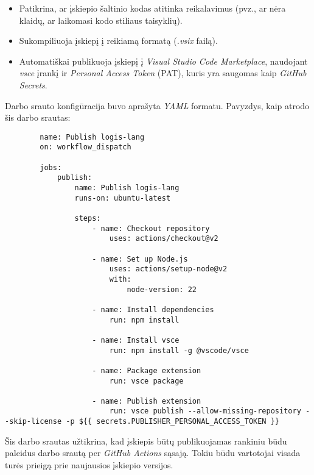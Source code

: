 \begin{activities}
{        \begin{itemize}
            \item Patikrina, ar įskiepio šaltinio kodas atitinka reikalavimus (pvz., ar nėra klaidų, ar laikomasi kodo stiliaus taisyklių).
            \item Sukompiliuoja įskiepį į reikiamą formatą (\textit{.vsix} failą).
            \item Automatiškai publikuoja įskiepį į \textit{Visual Studio Code Marketplace}, naudojant \textit{vsce} įrankį ir \textit{Personal Access Token} (PAT), kuris yra saugomas kaip \textit{GitHub Secrets}.
        \end{itemize}

        Darbo srauto konfigūracija buvo aprašyta \textit{YAML} formatu. Pavyzdys, kaip atrodo šis darbo srautas:

        \begin{verbatim}
        name: Publish logis-lang
        on: workflow_dispatch

        jobs:
            publish:
                name: Publish logis-lang
                runs-on: ubuntu-latest

                steps:
                    - name: Checkout repository
                        uses: actions/checkout@v2

                    - name: Set up Node.js
                        uses: actions/setup-node@v2
                        with:
                            node-version: 22

                    - name: Install dependencies
                        run: npm install

                    - name: Install vsce
                        run: npm install -g @vscode/vsce

                    - name: Package extension
                        run: vsce package

                    - name: Publish extension
                        run: vsce publish --allow-missing-repository --skip-license -p ${{ secrets.PUBLISHER_PERSONAL_ACCESS_TOKEN }}
        \end{verbatim}

        Šis darbo srautas užtikrina, kad įskiepis būtų publikuojamas rankiniu būdu paleidus darbo srautą per \textit{GitHub Actions} sąsają. Tokiu būdu vartotojai visada turės prieigą prie naujausios įskiepio versijos.

    }
    \rezultatai{} \row


\end{activities}